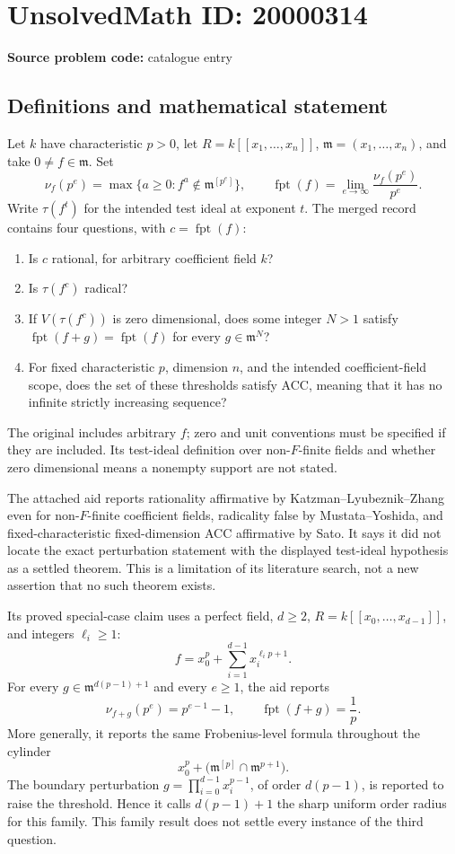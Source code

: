 \documentclass[11pt]{article}
\begin{document}
\section*{UnsolvedMath ID: 20000314}
\textbf{Source problem code:} catalogue entry
\subsection{Definitions and mathematical statement}
Let \(k\) have characteristic \(p>0\), let \(R=k[[x_1,\ldots,x_n]]\), \(\mathfrak m=(x_1,\ldots,x_n)\), and take \(0\ne f\in\mathfrak m\). Set
\[
\nu_f(p^e)=\max\{a\geq0:f^a\notin\mathfrak m^{[p^e]}\},\qquad
\operatorname{fpt}(f)=\lim_{e\to\infty}\frac{\nu_f(p^e)}{p^e}.
\]
Write \(\tau(f^t)\) for the intended test ideal at exponent \(t\). The merged record contains four questions, with \(c=\operatorname{fpt}(f)\):
\begin{enumerate}
\item Is \(c\) rational, for arbitrary coefficient field \(k\)?
\item Is \(\tau(f^c)\) radical?
\item If \(V(\tau(f^c))\) is zero dimensional, does some integer \(N>1\) satisfy \(\operatorname{fpt}(f+g)=\operatorname{fpt}(f)\) for every \(g\in\mathfrak m^N\)?
\item For fixed characteristic \(p\), dimension \(n\), and the intended coefficient-field scope, does the set of these thresholds satisfy ACC, meaning that it has no infinite strictly increasing sequence?
\end{enumerate}
The original includes arbitrary \(f\); zero and unit conventions must be specified if they are included. Its test-ideal definition over non-\(F\)-finite fields and whether zero dimensional means a nonempty support are not stated.

The attached aid reports rationality affirmative by Katzman--Lyubeznik--Zhang even for non-\(F\)-finite coefficient fields, radicality false by Mustata--Yoshida, and fixed-characteristic fixed-dimension ACC affirmative by Sato. It says it did not locate the exact perturbation statement with the displayed test-ideal hypothesis as a settled theorem. This is a limitation of its literature search, not a new assertion that no such theorem exists.

Its proved special-case claim uses a perfect field, \(d\geq2\), \(R=k[[x_0,\ldots,x_{d-1}]]\), and integers \(\ell_i\geq1\):
\[
f=x_0^p+\sum_{i=1}^{d-1}x_i^{\ell_i p+1}.
\]
For every \(g\in\mathfrak m^{d(p-1)+1}\) and every \(e\geq1\), the aid reports
\[
\nu_{f+g}(p^e)=p^{e-1}-1,
\qquad\operatorname{fpt}(f+g)=\frac1p.
\]
More generally, it reports the same Frobenius-level formula throughout the cylinder
\[
x_0^p+\bigl(\mathfrak m^{[p]}\cap\mathfrak m^{p+1}\bigr).
\]
The boundary perturbation \(g=\prod_{i=0}^{d-1}x_i^{p-1}\), of order \(d(p-1)\), is reported to raise the threshold. Hence it calls \(d(p-1)+1\) the sharp uniform order radius for this family. This family result does not settle every instance of the third question.
\end{document}
